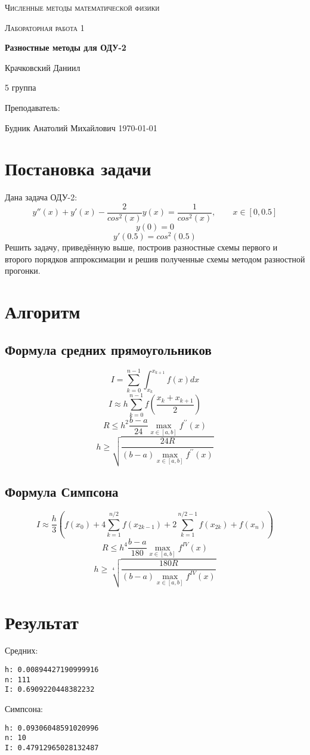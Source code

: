 \documentclass[12pt]{article}
\author{Даниил Крачковский}
\makeatletter
\newcommand{\verbatimfont}[1]{\renewcommand{\verbatim@font}{\ttfamily#1}}
\makeatother
\begin{document}
	\begin{titlepage}
		\centering
		{\scshape\LARGE Численные методы математической физики \par}
		\vfill
		{\scshape\Large Лабораторная работа 1 \par}
		\vspace{1cm}
		{\huge\bfseries Разностные методы для ОДУ-2 \par}
		\vspace{2cm}
		{\Large Крачковский Даниил\par}
		5 группа \par
		\vspace{0.5cm}
		Преподаватель:\par
		Будник Анатолий Михайлович
		\vfill
		{\large \today}
	\end{titlepage}
	
	
\section*{Постановка задачи}
	Дана задача ОДУ-2:
	$$
		y''(x) + y'(x) - \dfrac{2}{cos^2(x)}y(x) = \dfrac{1}{cos^2(x)}, \qquad x \in [0, 0.5]
	$$
	$$
		y(0) = 0
	$$
	$$
		y'(0.5) = cos^2(0.5)
	$$
	Решить задачу, приведённую выше, построив разностные схемы первого и второго порядков аппроксимации и решив полученные схемы методом разностной прогонки.
\section*{Алгоритм}
	\subsection*{Формула средних прямоугольников}
	\[
		I = \sum_{k=0}^{n-1} \int_{x_k}^{x_{k+1}} f(x)dx 
	\]
	\[
		I \approx h  \sum_{k=0}^{n-1} f(\frac{x_k + x_{k+1}}{2})
	\]
	\[
		R \leq h^2 \frac{b-a}{24} \max_{x \in [a, b]} f^{\prime\prime} (x)
	\]
	\[
		h \geq \sqrt{\frac{24R}{(b-a) \max_{x \in [a, b]} f^{\prime\prime} (x)} }
	\]
	\subsection*{Формула Симпсона}
	\[
		I \approx \frac{h}{3} \left(f(x_0) + 4 \sum_{k=1}^{n/2} f(x_{2k -1}) + 2 \sum_{k=1}^{n/2 - 1} f(x_{2k}) + f(x_n)\right)
	\]
	\[
		R \leq h^4 \frac{b-a}{180} \max_{x \in [a, b]} f^{IV} (x)
	\]
	\[
		h \geq \sqrt[4]{\frac{180R}{(b-a) \max_{x \in [a, b]} f^{IV} (x)} }
	\]
	
\section{Результат}
Средних:
\verbatimfont{\small}
\begin{verbatim}
h: 0.00894427190999916
n: 111
I: 0.6909220448382232
\end{verbatim}
Симпсона:
\verbatimfont{\small}
\begin{verbatim}
h: 0.09306048591020996
n: 10
I: 0.47912965028132487
\end{verbatim}
\newpage
\end{document}
